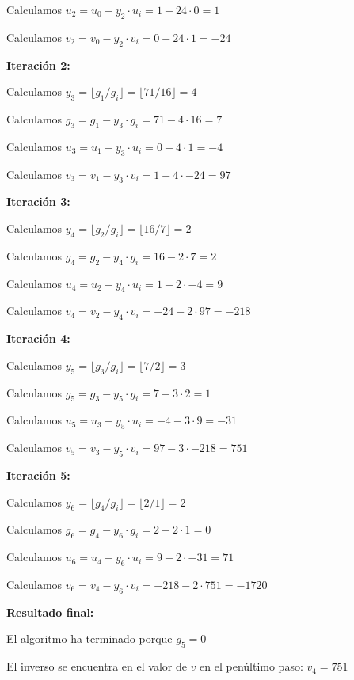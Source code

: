 Calculamos $u_2 = u_0 - y_2 \cdot u_i = 1 - 24 \cdot 0 = 1$

Calculamos $v_2 = v_0 - y_2 \cdot v_i = 0 - 24 \cdot 1 = -24$



\textbf{Iteración 2:}

Calculamos $y_3 = \lfloor g_1 / g_i \rfloor = \lfloor 71 / 16 \rfloor = 4$

Calculamos $g_3 = g_1 - y_3 \cdot g_i = 71 - 4 \cdot 16 = 7$

Calculamos $u_3 = u_1 - y_3 \cdot u_i = 0 - 4 \cdot 1 = -4$

Calculamos $v_3 = v_1 - y_3 \cdot v_i = 1 - 4 \cdot -24 = 97$



\textbf{Iteración 3:}

Calculamos $y_4 = \lfloor g_2 / g_i \rfloor = \lfloor 16 / 7 \rfloor = 2$

Calculamos $g_4 = g_2 - y_4 \cdot g_i = 16 - 2 \cdot 7 = 2$

Calculamos $u_4 = u_2 - y_4 \cdot u_i = 1 - 2 \cdot -4 = 9$

Calculamos $v_4 = v_2 - y_4 \cdot v_i = -24 - 2 \cdot 97 = -218$



\textbf{Iteración 4:}

Calculamos $y_5 = \lfloor g_3 / g_i \rfloor = \lfloor 7 / 2 \rfloor = 3$

Calculamos $g_5 = g_3 - y_5 \cdot g_i = 7 - 3 \cdot 2 = 1$

Calculamos $u_5 = u_3 - y_5 \cdot u_i = -4 - 3 \cdot 9 = -31$

Calculamos $v_5 = v_3 - y_5 \cdot v_i = 97 - 3 \cdot -218 = 751$



\textbf{Iteración 5:}

Calculamos $y_6 = \lfloor g_4 / g_i \rfloor = \lfloor 2 / 1 \rfloor = 2$

Calculamos $g_6 = g_4 - y_6 \cdot g_i = 2 - 2 \cdot 1 = 0$

Calculamos $u_6 = u_4 - y_6 \cdot u_i = 9 - 2 \cdot -31 = 71$

Calculamos $v_6 = v_4 - y_6 \cdot v_i = -218 - 2 \cdot 751 = -1720$



\textbf{Resultado final:}

El algoritmo ha terminado porque $g_5 = 0$

El inverso se encuentra en el valor de $v$ en el penúltimo paso: $v_4 = 751$

